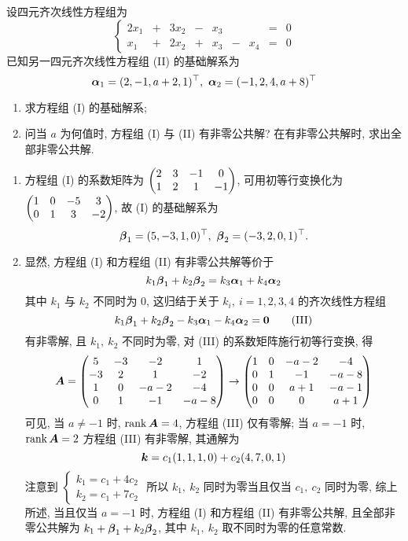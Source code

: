 \begin{example}[2005 西安电子科技大学]
    设四元齐次线性方程组为
    \begin{equation*}
        \left\{\begin{matrix}
            2x_1 & + & 3x_2 & - & x_3 &   &     & = & 0 \\
            x_1  & + & 2x_2 & + & x_3 & - & x_4 & = & 0
        \end{matrix}\right.
        \tag{I}
    \end{equation*}
    已知另一四元齐次线性方程组 (II) 的基础解系为 $$\vb*{\alpha}_1=(2,-1,a+2,1)^\top,~\vb*{\alpha}_2=(-1,2,4,a+8)^\top$$
    \begin{enumerate}[label=(\arabic{*})]
        \item 求方程组 (I) 的基础解系;
        \item 问当 $a$ 为何值时, 方程组 (I) 与 (II) 有非零公共解? 在有非零公共解时, 求出全部非零公共解.
    \end{enumerate}
\end{example}
\begin{solution}
    \begin{enumerate}[label=(\arabic{*})]
        \item 方程组 (I) 的系数矩阵为 $\mqty(2&3&-1&0\\1&2&1&-1)$, 可用初等行变换化为 $\mqty(1&0&-5&3\\0&1&3&-2)$, 故 (I) 的基础解系为
              $$\vb*{\beta}_1=(5,-3,1,0)^\top,~\vb*{\beta}_2=(-3,2,0,1)^\top.$$
        \item 显然, 方程组 (I) 和方程组 (II) 有非零公共解等价于 $$k_1\vb*{\beta}_1+k_2\vb*{\beta}_2=k_3\vb*{\alpha}_1+k_4\vb*{\alpha}_2$$
              其中 $k_1$ 与 $k_2$ 不同时为 0, 这归结于关于 $k_i,~i=1,2,3,4$ 的齐次线性方程组
              \begin{equation*}
                  k_1\vb*{\beta}_1+k_2\vb*{\beta}_2-k_3\vb*{\alpha}_1-k_4\vb*{\alpha}_2=\vb*{0}
                  \tag{III}
              \end{equation*}
              有非零解, 且 $k_1,~k_2$ 不同时为零, 对 (III) 的系数矩阵施行初等行变换, 得
              $$\vb*{A}=\mqty(5&-3&-2&1\\-3&2&1&-2\\1&0&-a-2&-4\\0&1&-1&-a-8)\to\mqty(1&0&-a-2&-4\\0&1&-1&-a-8\\0&0&a+1&-a-1\\0&0&0&a+1)$$
              可见, 当 $a\neq-1$ 时, $\rank\vb*{A}=4$, 方程组 (III) 仅有零解; 当 $a=-1$ 时, $\rank\vb*{A}=2$ 方程组 (III) 有非零解, 其通解为
              $$\vb*{k}=c_1(1,1,1,0)+c_2(4,7,0,1)$$
              注意到 $\begin{cases}
                      k_1=c_1+4c_2 \\k_2=c_1+7c_2
                  \end{cases}$ 所以 $k_1,~k_2$ 同时为零当且仅当 $c_1,~c_2$ 同时为零,
              综上所述, 当且仅当 $a=-1$ 时, 方程组 (I) 和方程组 (II) 有非零公共解, 且全部非零公共解为 $k_1+\vb*{\beta}_1+k_2\vb*{\beta}_2$,
              其中 $k_1,~k_2$ 取不同时为零的任意常数.
    \end{enumerate}
\end{solution}
